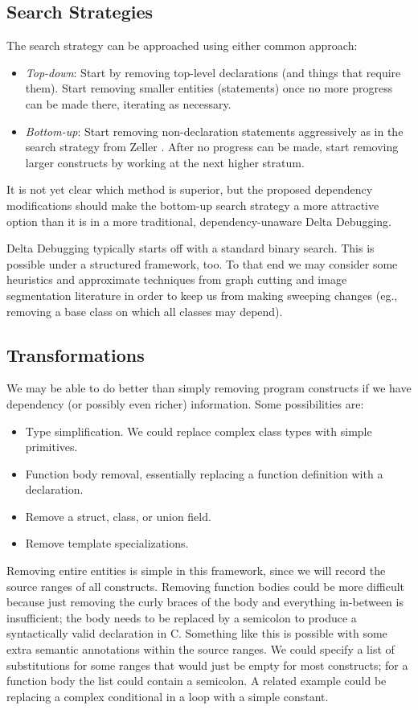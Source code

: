\documentclass[11pt]{article}
\begin{document}
\subsection{Search Strategies}
The search strategy can be approached using either common approach:
\begin{itemize}
\item \emph{Top-down}: Start by removing top-level declarations (and things that
  require them). Start removing smaller entities (statements) once no more
  progress can be made there, iterating as necessary.
\item \emph{Bottom-up}: Start removing non-declaration statements aggressively
  as in the search strategy from Zeller \cite{dd}. After no progress can be
  made, start removing larger constructs by working at the next higher stratum.
\end{itemize}
It is not yet clear which method is superior, but the proposed dependency
modifications should make the bottom-up search strategy a more attractive option
than it is in a more traditional, dependency-unaware Delta Debugging.

Delta Debugging typically starts off with a standard binary search. This is
possible under a structured framework, too. To that end we may consider some
heuristics and approximate techniques from graph cutting and image segmentation
literature \cite{nc} in order to keep us from making sweeping changes (eg.,
removing a base class on which all classes may depend).

\subsection{Transformations}
We may be able to do better than simply removing program constructs if we have
dependency (or possibly even richer) information.  Some possibilities are:
\begin{itemize}
\item Type simplification.  We could replace complex class types with simple
  primitives.
\item Function body removal, essentially replacing a function definition with a
  declaration.
\item Remove a struct, class, or union field.
\item Remove template specializations.
\end{itemize}

Removing entire entities is simple in this framework, since we will record the
source ranges of all constructs.  Removing function bodies could be more
difficult because just removing the curly braces of the body and everything
in-between is insufficient; the body needs to be replaced by a semicolon to
produce a syntactically valid declaration in C.  Something like this is possible
with some extra semantic annotations within the source ranges. We could specify
a list of substitutions for some ranges that would just be empty for most
constructs; for a function body the list could contain a semicolon.  A related
example could be replacing a complex conditional in a loop with a simple
constant.
\end{document}
